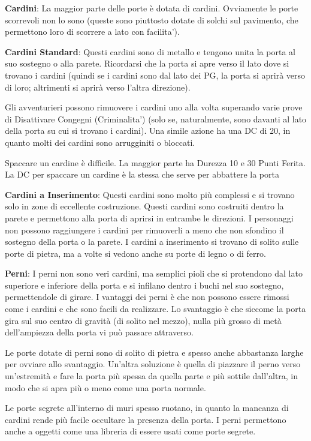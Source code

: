 \documentclass[a4paper,11pt,twoside,openany]{book}
\begin{document}
{\textbf{Cardini}: La maggior parte delle porte è dotata di cardini. Ovviamente le porte scorrevoli non lo sono (queste sono piuttosto dotate di solchi sul pavimento, che permettono loro di scorrere a lato con facilita').

\textbf{Cardini Standard}: Questi cardini sono di metallo e tengono unita la porta al suo sostegno o alla parete. Ricordarsi che la porta si apre verso il lato dove si trovano i cardini (quindi se i cardini sono dal lato dei PG, la porta si aprirà verso di loro; altrimenti si aprirà verso l’altra direzione). 

Gli avventurieri possono rimuovere i cardini uno alla volta superando varie prove di Disattivare Congegni (Criminalita') (solo se, naturalmente, sono davanti al lato della porta su cui si trovano i cardini). Una simile azione ha una DC di 20, in quanto molti dei cardini sono arrugginiti o bloccati. 

Spaccare un cardine è difficile. La maggior parte ha Durezza 10 e 30 Punti Ferita. La DC per spaccare un cardine è la stessa che serve per abbattere la porta

\textbf{Cardini a Inserimento}: Questi cardini sono molto più complessi e si trovano solo in zone di eccellente costruzione. Questi cardini sono costruiti dentro la parete e permettono alla porta di aprirsi in entrambe le direzioni. I personaggi non possono raggiungere i cardini per rimuoverli a meno che non sfondino il sostegno della porta o la parete. I cardini a inserimento si trovano di solito sulle porte di pietra, ma a volte si vedono anche su porte di legno o di ferro.

\textbf{Perni}: I perni non sono veri cardini, ma semplici pioli che si protendono dal lato superiore e inferiore della porta e si infilano dentro i buchi nel suo sostegno, permettendole di girare. I vantaggi dei perni è che non possono essere rimossi come i cardini e che sono facili da realizzare. Lo svantaggio è che siccome la porta gira sul suo centro di gravità (di solito nel mezzo), nulla più grosso di metà dell'ampiezza della porta vi può passare attraverso.

Le porte dotate di perni sono di solito di pietra e spesso anche abbastanza larghe per ovviare allo svantaggio. Un'altra soluzione è quella di piazzare il perno verso un'estremità e fare la porta più spessa da quella parte e più sottile dall'altra, in modo che si apra più o meno come una porta normale.

Le porte segrete all'interno di muri spesso ruotano, in quanto la mancanza di cardini rende più facile occultare la presenza della porta. I perni permettono anche a oggetti come una libreria di essere usati come porte segrete.

}
\end{document}
